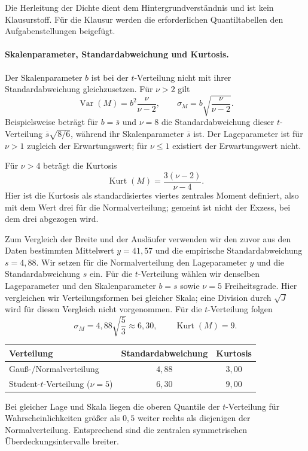 Die Herleitung der Dichte dient dem Hintergrundverständnis und ist
kein Klausurstoff. Für die Klausur werden die erforderlichen
Quantiltabellen den Aufgabenstellungen beigefügt.

\paragraph{Skalenparameter, Standardabweichung und Kurtosis.}
Der Skalenparameter $b$ ist bei der $t$-Verteilung nicht mit ihrer
Standardabweichung gleichzusetzen. Für $\nu>2$ gilt
\begin{equation}
  \operatorname{Var}(M)=b^2\frac{\nu}{\nu-2},
  \qquad
  \sigma_M=b\sqrt{\frac{\nu}{\nu-2}}.
  \label{eq:t_varianz_skala}
\end{equation}
Beispielsweise beträgt für $b=\overline s$ und $\nu=8$ die
Standardabweichung dieser $t$-Verteilung
$\overline s\sqrt{8/6}$, während ihr Skalenparameter
$\overline s$ ist. Der Lageparameter ist für $\nu>1$ zugleich
der Erwartungswert; für $\nu\leq1$ existiert der Erwartungswert nicht.

Für $\nu>4$ beträgt die Kurtosis
\begin{equation}
  \operatorname{Kurt}(M)=\frac{3(\nu-2)}{\nu-4}.
\end{equation}
Hier ist die Kurtosis als standardisiertes viertes zentrales Moment
definiert, also mit dem Wert drei für die Normalverteilung; gemeint
ist nicht der Exzess, bei dem drei abgezogen wird.

Zum Vergleich der Breite und der Ausläufer verwenden wir den zuvor
aus den Daten bestimmten Mittelwert $y=41{,}57$ und die empirische
Standardabweichung $s=4{,}88$. Wir setzen für die Normalverteilung
den Lageparameter $y$ und die Standardabweichung $s$ ein. Für die
$t$-Verteilung wählen wir denselben Lageparameter und den
Skalenparameter $b=s$ sowie $\nu=5$ Freiheitsgrade.
Hier vergleichen wir Verteilungsformen bei gleicher Skala; eine
Division durch $\sqrt J$ wird für diesen Vergleich nicht vorgenommen.
Für die $t$-Verteilung folgen
\[
  \sigma_M=4{,}88\sqrt{\frac{5}{3}}\approx6{,}30,
  \qquad \operatorname{Kurt}(M)=9.
\]
\begin{center}
\begin{tabular}{l||c|c}
\hline
Verteilung & Standardabweichung & Kurtosis\\
\hline
Gauß-/Normalverteilung & $4{,}88$ & $3{,}00$\\
Student-$t$-Verteilung ($\nu=5$) & $6{,}30$ & $9{,}00$\\
\hline
\end{tabular}
\end{center}
Bei gleicher Lage und Skala liegen die oberen Quantile der
$t$-Verteilung für Wahrscheinlichkeiten größer als $0{,}5$ weiter
rechts als diejenigen der Normalverteilung. Entsprechend sind die
zentralen symmetrischen Überdeckungsintervalle breiter.

